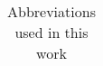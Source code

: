 \begin{table}[H]
\begin{tabular}{|| c | c ||}
    \hline
    \end{tabular}
    \caption{Abbreviations used in this work}
    \label{tab:abbreviations}
\end{table}